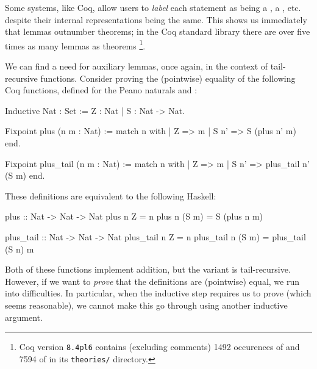 Some systems, like Coq, allow users to \emph{label} each statement as being a
, a , etc. despite their internal representations being
the same. This shows us immediately that lemmas outnumber theorems; in the Coq
standard library there are over five times as many lemmas as theorems
\footnote{Coq version \texttt{8.4pl6} contains (excluding comments) 1492
  occurences of  and 7594 of  in its \texttt{theories/}
  directory.}.



We can find a need for auxiliary lemmas, once again, in the context of
tail-recursive functions. Consider proving the (pointwise) equality of the
following Coq functions, defined for the Peano naturals  and :

\begin{coqblock}
Inductive Nat : Set := Z : Nat
                     | S : Nat -> Nat.

Fixpoint plus      (n m : Nat) := match n with
                                      | Z    => m
                                      | S n' => S (plus n' m)
                                  end.

Fixpoint plus_tail (n m : Nat) := match n with
                                      | Z    => m
                                      | S n' => plus_tail n' (S m)
                                  end.
\end{coqblock}

These definitions are equivalent to the following Haskell:

\begin{haskell}
plus :: Nat -> Nat -> Nat
plus      n  Z    = n
plus      n (S m) = S (plus n m)

plus_tail :: Nat -> Nat -> Nat
plus_tail n  Z    = n
plus_tail n (S m) = plus_tail (S n) m
\end{haskell}

Both of these functions implement addition, but the  variant is
tail-recursive. However, if we want to \emph{prove} that the definitions are
(pointwise) equal, we run into difficulties. In particular, when the inductive
step requires us to prove  (which seems
reasonable), we cannot make this go through using another inductive argument.

